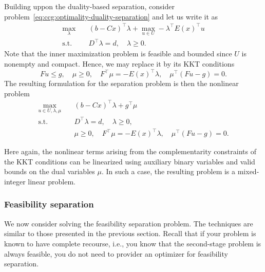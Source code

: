 

{\color{red}
Building uppon the duality-based separation, consider
problem~\eqref{eq:ccg:optimality-duality-separation} and let us write it as 
\begin{subequations}
    \begin{align*}
        \max_{\lambda} \quad & (b - Cx)^\top\lambda + 
        \max_{u\in U} -\lambda^\top E(x)^\top u \\
        \text{s.t.} \quad & D^\top \lambda = d, \quad \lambda \ge 0.
    \end{align*}
\end{subequations}
Note that the inner maximization problem is feasible and bounded since $U$ is
nonempty and compact. Hence, we may replace it by its KKT conditions
\begin{equation*}
    Fu \le g, \quad \mu \ge 0, \quad F^\top\mu = -E(x)^\top\lambda, \quad \mu^\top( Fu - g ) = 0.
\end{equation*}
The resulting formulation for the separation problem is then the nonlinear
problem
\begin{subequations}
    \begin{align*}
        \max_{u\in U,\lambda,\mu} \quad & (b - Cx)^\top\lambda + g^\top\mu \\
        \text{s.t.} \quad & D^\top \lambda = d, \quad \lambda \ge 0, \\
        & \mu \ge 0, \quad F^\top\mu = -E(x)^\top\lambda, \quad \mu^\top( Fu - g ) = 0.
    \end{align*}
\end{subequations}

Here again, the nonlinear terms arising from the complementarity constraints
of the KKT conditions can be linearized using auxiliary binary variables and
valid bounds on the dual variables $\mu$. In such a case, the resulting
problem is a mixed-integer linear problem. 
}

\subsubsection{Feasibility separation}

We now consider solving the feasibility separation problem. The techniques are
similar to those presented in the previous section. Recall that if your
problem is known to have complete recourse, i.e., you know that the
second-stage problem is always feasible, you do not need to provider an
optimizer for feasibility separation.

